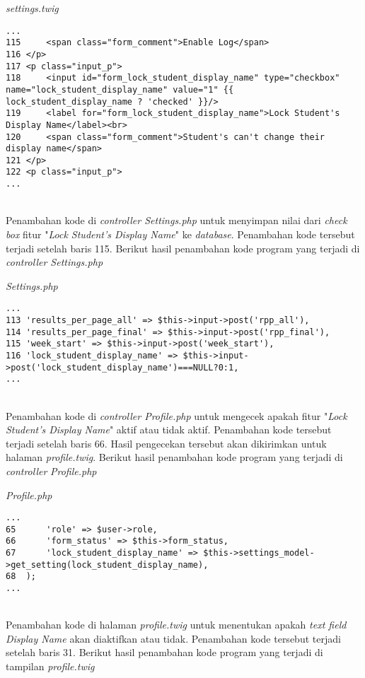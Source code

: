 \textit{settings.twig}
\begin{lstlisting}[basicstyle=\ttfamily, frame=single,
columns=fullflexible, keepspaces=true, breaklines=true]
...
115		<span class="form_comment">Enable Log</span>
116	</p>
117	<p class="input_p">
118		<input id="form_lock_student_display_name" type="checkbox" name="lock_student_display_name" value="1" {{ lock_student_display_name ? 'checked' }}/>
119		<label for="form_lock_student_display_name">Lock Student's Display Name</label><br>
120		<span class="form_comment">Student's can't change their display name</span>
121	</p>
122	<p class="input_p">
...
\end{lstlisting}
~\\
Penambahan kode di \textit{controller Settings.php} untuk menyimpan nilai dari \textit{check box} fitur "\textit{Lock Student's Display Name}" ke \textit{database}. Penambahan kode tersebut terjadi setelah baris 115. Berikut hasil penambahan kode program yang terjadi di \textit{controller Settings.php}

\textit{Settings.php}
\begin{lstlisting}[basicstyle=\ttfamily, frame=single,
columns=fullflexible, keepspaces=true, breaklines=true]
...
113	'results_per_page_all' => $this->input->post('rpp_all'),
114	'results_per_page_final' => $this->input->post('rpp_final'),
115	'week_start' => $this->input->post('week_start'),
116	'lock_student_display_name' => $this->input->post('lock_student_display_name')===NULL?0:1,
...
\end{lstlisting}
~\\
Penambahan kode di \textit{controller Profile.php} untuk mengecek apakah fitur "\textit{Lock Student's Display Name}" aktif atau tidak aktif. Penambahan kode tersebut terjadi setelah baris 66. Hasil pengecekan tersebut akan dikirimkan untuk halaman \textit{profile.twig}. Berikut hasil penambahan kode program yang terjadi di \textit{controller} \textit{Profile.php}

\textit{Profile.php}
\begin{lstlisting}[basicstyle=\ttfamily, frame=single,
columns=fullflexible, keepspaces=true, breaklines=true]
...
65		'role' => $user->role,
66		'form_status' => $this->form_status,
67		'lock_student_display_name' => $this->settings_model->get_setting(lock_student_display_name),
68	);
...
\end{lstlisting}
~\\
Penambahan kode di halaman \textit{profile.twig} untuk menentukan apakah \textit{text field Display Name} akan diaktifkan atau tidak. Penambahan kode tersebut terjadi setelah baris 31. Berikut hasil penambahan kode program yang terjadi di tampilan \textit{profile.twig}

